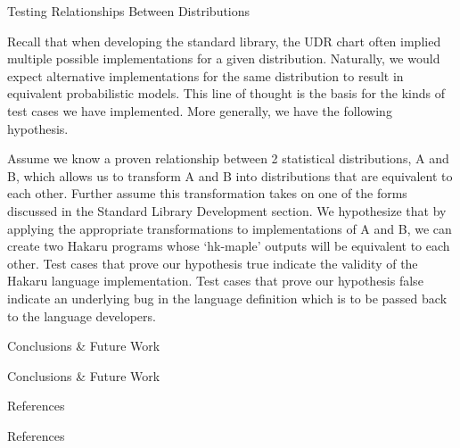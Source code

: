 \documentclass[22pt]{beamer}
\begin{document}
\begin{frame}[fragile]
\begin{textblock}{5}
\begin{block}{Testing Relationships Between Distributions}
\justifying

\tiny{Recall that when developing the standard library, the UDR chart often implied multiple possible implementations for a given distribution. Naturally, we would expect alternative implementations for the same distribution to result in equivalent probabilistic models. This line of thought is the basis for the kinds of test cases we have implemented. More generally, we have the following hypothesis.}

\bigskip

\tiny{Assume we know a proven relationship between 2 statistical distributions, A and B, which allows us to transform A and B into distributions that are equivalent to each other. Further assume this transformation takes on one of the forms discussed in the Standard Library Development section. We hypothesize that by applying the appropriate transformations to implementations of A and B, we can create two Hakaru programs whose `hk-maple' outputs will be equivalent to each other. Test cases that prove our hypothesis true indicate the validity of the Hakaru language implementation. Test cases that prove our hypothesis false indicate an underlying bug in the language definition which is to be passed back to the language developers.
}

\end{block}


\begin{block}{Conclusions \& Future Work}

Conclusions \& Future Work

\end{block}


\begin{block}{References}

References

\end{block}


% 

\end{textblock}
\end{frame}
\end{document}
